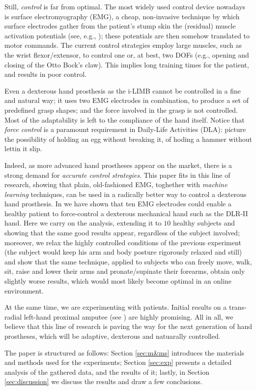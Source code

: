 Still, \emph{control} is far from optimal. The most widely used control
device nowadays is surface electromyography (EMG), a cheap,
non-invasive technique by which surface electrodes gather from the
patient's stump skin the (residual) muscle activation potentials (see,
e.g., \cite{deluca}); these potentials are then somehow translated to
motor commands. The current control strategies employ large muscles,
such as the wrist flexor/extensor, to control one or, at best, two
DOFs (e.g., opening and closing of the Otto Bock's claw). This implies
long training times for the patient, and results in poor control.

Even a dexterous hand prosthesis as the i-LIMB cannot be controlled in
a fine and natural way; it uses two EMG electrodes in combination, to
produce a set of predefined grasp shapes; and the force involved in
the grasp is not controlled. Most of the adaptability is left to the
compliance of the hand itself. Notice that \emph{force control} is a
paramount requirement in Daily-Life Activities (DLA): picture the
possibility of holding an egg without breaking it, of hoding a hammer
without lettin it slip.

Indeed, as more advanced hand prostheses appear on the market, there
is a strong demand for \emph{accurate control strategies}. This paper
fits in this line of research, showing that plain, old-fashioned EMG,
toghether with \emph{machine learning} techniques, can be used in a
radically better way to control a dexterous hand prosthesis. In
\cite{2008.ICRA,2008.BioCyb} we have shown that ten EMG electrodes
could enable a healthy patient to force-control a dexterous mechanical
hand such as the DLR-II hand. Here we carry on the analysis, extending
it to $10$ healthy subjects and showing that the same good results
appear, regardless of the subject involved; moreover, we relax the
highly controlled conditions of the previous experiment (the subject
would keep his arm and body posture rigorously relaxed and still) and
show that the same technique, applied to subjects who can freely move,
walk, sit, raise and lower their arms and pronate/supinate their
forearms, obtain only slightly worse results, which would most likely
become optimal in an online environment.

At the same time, we are experimenting with patients. Initial results
on a trans-radial left-hand proximal amputee (see
\cite{posterNEURO-ROB}) are highly promising. All in all, we believe
that this line of research is paving the way for the next generation
of hand prostheses, which will be adaptive, dexterous and natuarally
controlled.

The paper is structured as follows: Section \ref{sec:m&ms} introduces
the materials and methods used for the experiments; Section
\ref{sec:exp} presents a detailed analysis of the gathered data, and
the results of it; lastly, in Section \ref{sec:discussion} we discuss
the results and draw a few conclusions.
